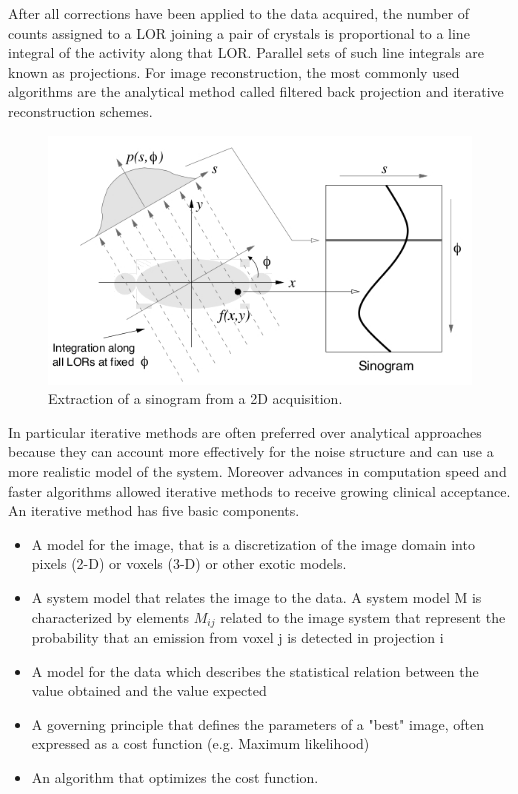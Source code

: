 After all corrections have been applied to the data acquired, the number of counts assigned to a LOR joining a pair of crystals is proportional to a line integral of the activity along that LOR. Parallel sets of such line integrals are known as projections.
For image reconstruction, the most commonly used algorithms are the analytical method called filtered back projection and iterative reconstruction schemes.
\begin{figure} 
\centering 
\includegraphics[width=12cm]{Pictures/Chapter_1/proj_sin.jpg}
\caption[Image reconstruction in PET]{Extraction of a sinogram from a 2D acquisition.}
\label{fig:reco}
\end{figure}
In particular iterative methods are often preferred over analytical approaches because they can account more effectively for the noise structure and can use a more realistic model of the system. Moreover advances in computation speed and faster algorithms allowed iterative methods to receive growing clinical acceptance.
An iterative method has five basic components.
\begin{itemize}
\item A model for the image, that is a discretization of the image domain into pixels (2-D) or voxels (3-D) or other exotic models.
\item A system model that relates the image to the data. A system model M is characterized by elements $M_{ij}$ related to the image system that represent the probability that an emission from voxel j is detected in projection i
\item A model for the data which describes the statistical relation between the value obtained and the value expected
\item A governing principle that defines the parameters of a "best" image, often expressed as a cost function (e.g. Maximum likelihood)
\item An algorithm that optimizes the cost function.
\end{itemize}

